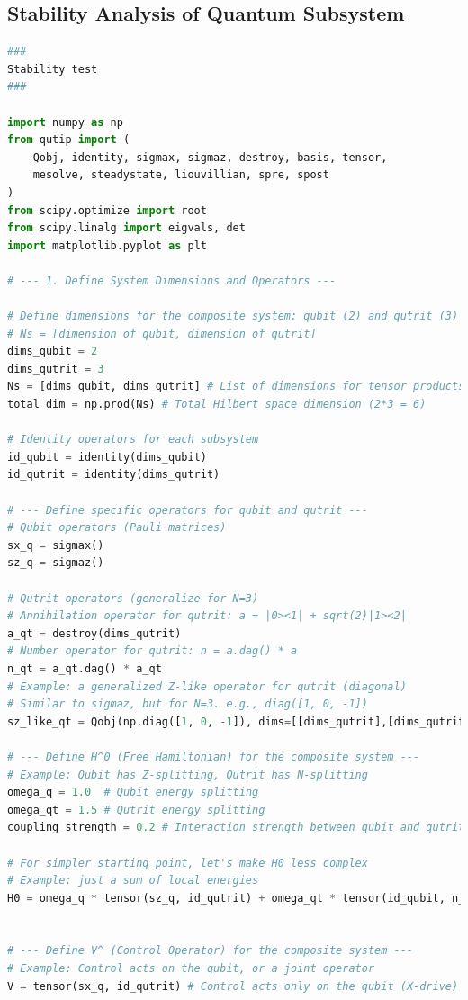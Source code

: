 \documentclass[9pt]{article}
\begin{document}
\subsection{Stability Analysis of Quantum Subsystem}
\begin{lstlisting}[language=Python, basicstyle=\ttfamily\footnotesize, breaklines=true, frame=single, caption={Python Code for Stability Analysis of Quantum Subsystem}, label={lst:qrd_code}]
###
Stability test
###

import numpy as np
from qutip import (
    Qobj, identity, sigmax, sigmaz, destroy, basis, tensor,
    mesolve, steadystate, liouvillian, spre, spost
)
from scipy.optimize import root
from scipy.linalg import eigvals, det
import matplotlib.pyplot as plt

# --- 1. Define System Dimensions and Operators ---

# Define dimensions for the composite system: qubit (2) and qutrit (3)
# Ns = [dimension of qubit, dimension of qutrit]
dims_qubit = 2
dims_qutrit = 3
Ns = [dims_qubit, dims_qutrit] # List of dimensions for tensor products
total_dim = np.prod(Ns) # Total Hilbert space dimension (2*3 = 6)

# Identity operators for each subsystem
id_qubit = identity(dims_qubit)
id_qutrit = identity(dims_qutrit)

# --- Define specific operators for qubit and qutrit ---
# Qubit operators (Pauli matrices)
sx_q = sigmax()
sz_q = sigmaz()

# Qutrit operators (generalize for N=3)
# Annihilation operator for qutrit: a = |0><1| + sqrt(2)|1><2|
a_qt = destroy(dims_qutrit)
# Number operator for qutrit: n = a.dag() * a
n_qt = a_qt.dag() * a_qt
# Example: a generalized Z-like operator for qutrit (diagonal)
# Similar to sigmaz, but for N=3. e.g., diag([1, 0, -1])
sz_like_qt = Qobj(np.diag([1, 0, -1]), dims=[[dims_qutrit],[dims_qutrit]])

# --- Define H^0 (Free Hamiltonian) for the composite system ---
# Example: Qubit has Z-splitting, Qutrit has N-splitting
omega_q = 1.0  # Qubit energy splitting
omega_qt = 1.5 # Qutrit energy splitting
coupling_strength = 0.2 # Interaction strength between qubit and qutrit

# For simpler starting point, let's make H0 less complex
# Example: just a sum of local energies
H0 = omega_q * tensor(sz_q, id_qutrit) + omega_qt * tensor(id_qubit, n_qt)


# --- Define V^ (Control Operator) for the composite system ---
# Example: Control acts on the qubit, or a joint operator
V = tensor(sx_q, id_qutrit) # Control acts only on the qubit (X-drive)



\end{lstlisting}
\end{document}
